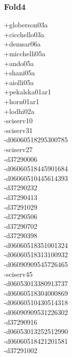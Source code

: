 \begin{multicols}{4}
\subsubsection*{Fold4}
+globerson03a\\
+cicchello03a\\
+demsar06a\\
+micchelli05a\\
+ando05a\\
+shani05a\\
+aiolli05a\\
+pekalska01ar1\\
+horn01ar1\\
+lodhi02a\\
-sciserv10\\
-sciserv31\\
-d06060518295300785\\
-sciserv27\\
-d37290006\\
-d06060518445901684\\
-d06060510445614393\\
-d37290232\\
-d37290413\\
-d37291029\\
-d37290506\\
-d37290702\\
-d37290398\\
-d06060518351001324\\
-d06060518313100932\\
-d06090909545726465\\
-sciserv45\\
-d06053013380913737\\
-d06060518304000869\\
-d06060510430514318\\
-d06090909531226302\\
-d37290916\\
-d06053013252512990\\
-d06060518421201581\\
-d37291002\\

\end{multicols}
